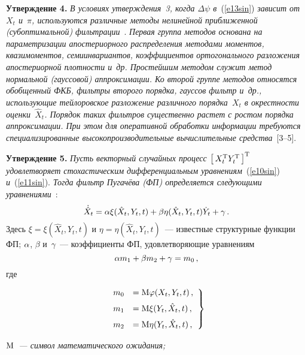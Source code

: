 \begin{multicols}{2}
\medskip

\noindent
\textbf{Утверждение 4.}
\textit{В условиях утверждения~3, когда $\Delta\psi$ в}~(\ref{e13sin}) \textit{зависит от~$X_t$ и~$\pi$, используются 
различные методы нелинейной приближенной (субоптимальной) фильтрации}~\cite{4sin}. \textit{Первая группа методов основана на 
параметризации апостериорного распределения методами моментов, квазимоментов, семиинвариантов, коэффициентов 
ортогонального разложения апостериорной плотности и~др. Простейшим методом служит метод нормальной (гауссовой) 
аппроксимации. Ко второй группе методов относятся обобщенный ФКБ, фильтры второго порядка, гауссов фильтр и~др., 
использующие тейлоровское разложение различного порядка~$X_t$ в окрестности оценки~$\hat X_t$. 
Порядок таких фильтров существенно растет с ростом порядка аппроксимации. При этом для оперативной 
обработки информации требуются специализированные высокопроизводительные вычислительные средства}~[3--5].

\medskip

\noindent
\textbf{Утверждение 5.}
\textit{Пусть векторный случайных процесс  $\left[\, X_t^{\mathrm{T}} Y_t^{\mathrm{T}}\,\right]^{\mathrm{T}}$ 
удовлетворяет стохастическим дифференциальным 
уравнениям}~(\ref{e10sin}) \textit{и}~(\ref{e11sin}). \textit{Тогда фильтр Пугачёва (ФП) определяется следующими уравнениями}~\cite{3sin, 4sin}:
\begin{equation*}
\dot{\hat X}_t =\alpha\xi (\hat X_t , Y_t,t) + \beta\eta (\hat X_t , Y_t,t)\dot Y_t +\gamma\,.
\end{equation*}
Здесь  $\xi=\xi (\hat X_t , Y_t,t)$ и $\eta=\eta(\hat X_t , Y_t,t)$~--- известные структурные функции ФП;  
$\alpha$, $\beta$ и~$\gamma$~--- коэффициенты ФП, удовлетворяющие уравнениям
\begin{equation*}
\alpha m_1 +\beta m_2 +\gamma =m_0\,,
\end{equation*}
где 
\pagebreak

\noindent
    \begin{equation}
    \left.
    \begin{array}{rl}
    m_0 &={\rm M} \varphi (X_t, Y_t, t)\,, \\[6pt]
    m_1 &={\rm M} \xi(Y_t, \hat X_t,  t)\,,\\[6pt] 
    m_2 &={\rm M} \eta (Y_t, \hat X_t, t)\,,
    \end{array}
    \right \}
    \label{e36sin}
    \end{equation}
    
    \vspace*{3pt}
    \noindent
\textit{${\rm M}$~--- символ математического ожидания;}


\end{multicols}
